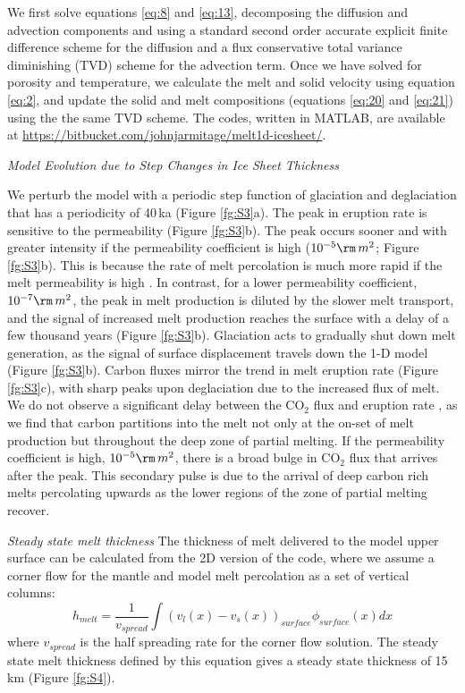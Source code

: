 \documentclass[draft,grl]{agutexSI2018}
\begin{document}
\begin{article}
We first solve equations \ref{eq:8} and \ref{eq:13}, decomposing the diffusion and advection components and using a standard second order accurate explicit finite difference scheme for the diffusion and a flux conservative total variance diminishing (TVD) scheme for the advection term. Once we have solved for porosity and temperature, we calculate the melt and solid velocity using equation \ref{eq:2}, and update the solid and melt compositions (equations \ref{eq:20} and \ref{eq:21}) using the the same TVD scheme. The codes, written in MATLAB, are available at \url{https://bitbucket.com/johnjarmitage/melt1d-icesheet/}.

\noindent\textit{Model Evolution due to Step Changes in Ice Sheet Thickness}

We perturb the model with a periodic step function of glaciation and deglaciation that has a periodicity of 40\,ka (Figure \ref{fg:S3}a). The peak in eruption rate is sensitive to the permeability (Figure \ref{fg:S3}b). The peak occurs sooner and with greater intensity if the permeability coefficient is high ($10^{-5}\rm\,m^{2}$; Figure \ref{fg:S3}b). This is because the rate of melt percolation is much more rapid if the melt permeability is high \citep{burley-2015}. In contrast, for a lower permeability coefficient, $10^{-7}\rm\,m^{2}$, the peak in melt production is diluted by the slower melt transport, and the signal of increased melt production reaches the surface with a delay of a few thousand years (Figure \ref{fg:S3}b). Glaciation acts to gradually shut down melt generation, as the signal of surface displacement travels down the 1-D model (Figure \ref{fg:S3}b). Carbon fluxes mirror the trend in melt eruption rate (Figure \ref{fg:S3}c), with sharp peaks upon deglaciation due to the increased flux of melt. We do not observe a significant delay between the CO$_{2}$ flux and eruption rate \citep{burley-2015}, as we find that carbon partitions into the melt not only at the on-set of melt production but throughout the deep zone of partial melting. If the permeability coefficient is high, $10^{-5}\rm\,m^{2}$, there is a broad bulge in CO$_{2}$ flux that arrives after the peak. This secondary pulse is due to the arrival of deep carbon rich melts percolating upwards as the lower regions of the zone of partial melting recover.

\noindent\textit{Steady state melt thickness}
The thickness of melt delivered to the model upper surface can be calculated from the 2D version of the code, where we assume a corner flow for the mantle and model melt percolation as a set of vertical columns:
\begin{equation}
h_{melt} = \frac{1}{v_{spread}}\int \left(v_{l}(x) - v_{s}(x) \right)_{surface}\phi_{surface}(x) dx
\end{equation}
where $v_{spread}$ is the half spreading rate for the corner flow solution. The steady state melt thickness defined by this equation gives a steady state thickness of 15\,km (Figure \ref{fg:S4}).


\end{article}
\end{document}
